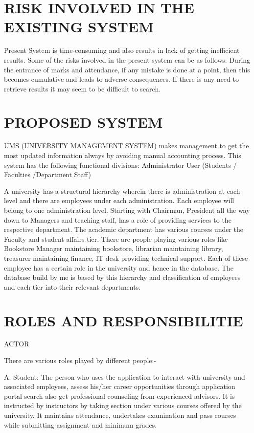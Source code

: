 \documentclass[12pt,letterpaper]{article}
\begin{document}
\section{RISK INVOLVED IN THE EXISTING SYSTEM}
Present System is time-consuming and also results in lack of getting inefficient results. Some of the risks involved in the present system can be as follows: During the entrance of marks and attendance, if any mistake is done at a point, then this becomes cumulative and leads to adverse consequences. If there is any need to retrieve results it may seem to be difficult to search.

\section{PROPOSED SYSTEM}
UMS (UNIVERSITY MANAGEMENT SYSTEM) makes management to get the most updated information always by avoiding manual accounting process. This system has the following functional divisions: 
Administrator
 User (Students / Faculties /Department Staff)


A university has a structural hierarchy wherein there is administration at each level and there are employees under each administration. Each employee will belong to one administration level. Starting with Chairman, President all the way down to Managers and teaching staff, has a role of providing services to the respective department. The academic department has various courses under the Faculty and student affairs tier. There are people playing various roles like Bookstore Manager maintaining bookstore, librarian maintaining library, treasurer maintaining finance, IT desk providing technical support. Each of these employee has a certain role in the university and hence in the database. The database build by me is based by this hierarchy and classification of employees and each tier into their relevant departments. 


\section{ROLES AND RESPONSIBILITIE}{ACTOR}

There are various roles played by different people:-
 
 A. Student:
  The person who uses the application to interact with university and associated employees, assess his/her career opportunities through application portal search also get professional counseling from experienced advisors. It is instructed by instructors by taking section under various courses offered by the university. It maintains attendance, undertakes examination and pass courses while submitting assignment and minimum grades.
 
\end{document}
